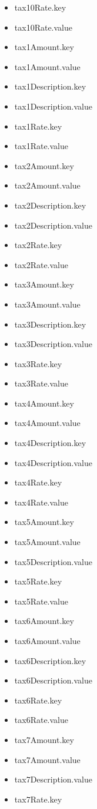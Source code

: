 \begin{multicols}{2}
\begin{itemize}
\item[] tax10Rate.key
\item[] tax10Rate.value
\item[] tax1Amount.key
\item[] tax1Amount.value
\item[] tax1Description.key
\item[] tax1Description.value
\item[] tax1Rate.key
\item[] tax1Rate.value
\item[] tax2Amount.key
\item[] tax2Amount.value
\item[] tax2Description.key
\item[] tax2Description.value
\item[] tax2Rate.key
\item[] tax2Rate.value
\item[] tax3Amount.key
\item[] tax3Amount.value
\item[] tax3Description.key
\item[] tax3Description.value
\item[] tax3Rate.key
\item[] tax3Rate.value
\item[] tax4Amount.key
\item[] tax4Amount.value
\item[] tax4Description.key
\item[] tax4Description.value
\item[] tax4Rate.key
\item[] tax4Rate.value
\item[] tax5Amount.key
\item[] tax5Amount.value
\item[] tax5Description.value
\item[] tax5Rate.key
\item[] tax5Rate.value
\item[] tax6Amount.key
\item[] tax6Amount.value
\item[] tax6Description.key
\item[] tax6Description.value
\item[] tax6Rate.key
\item[] tax6Rate.value
\item[] tax7Amount.key
\item[] tax7Amount.value
\item[] tax7Description.value
\item[] tax7Rate.key

\end{itemize}
\end{multicols}
